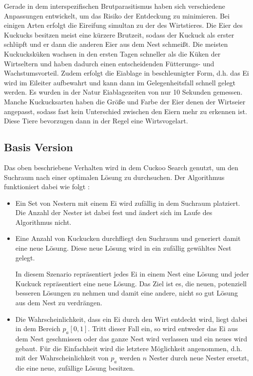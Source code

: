 \documentclass[conference]{IEEEtran}
\begin{document}
      Gerade in dem interspezifischen Brutparasitismus haben sich verschiedene Anpassungen entwickelt, um das Risiko der Entdeckung 
      zu minimieren. Bei einigen Arten erfolgt die Eireifung simultan zu der des Wirtstieres. Die Eier des Kuckucks besitzen meist 
      eine kürzere Brutzeit, sodass der Kuckuck als erster schlüpft und er dann die anderen Eier aus dem Nest schmeißt. Die meisten 
      Kuckucksküken wachsen in den ersten Tagen schneller als die Küken der Wirtseltern und haben dadurch einen entscheidenden 
      Fütterungs- und Wachstumsvorteil.  Zudem erfolgt die Eiablage in beschleunigter Form, d.h. das Ei wird im Eileiter aufbewahrt 
      und kann dann im Gelegenheitsfall schnell gelegt werden. Es wurden in der Natur Eiablagezeiten von nur 10 Sekunden gemessen. 
      Manche Kuckucksarten haben die Größe und Farbe der Eier denen der Wirtseier angepasst, sodass fast kein Unterschied zwischen 
      den Eiern mehr zu erkennen ist. Diese Tiere bevorzugen dann in der Regel eine Wirtsvogelart.         


    \subsection{Basis Version}
      Das oben beschriebene Verhalten wird in dem Cuckoo Search genutzt, um den Suchraum nach einer optimalen Lösung 
      zu durchsuchen. Der Algorithmus funktioniert dabei wie folgt \cite{b1}:

      \begin{itemize}
        \item Ein Set von Nestern mit einem Ei wird zufällig in dem Suchraum platziert. Die Anzahl der Nester 
          ist dabei fest und ändert sich im Laufe des Algorithmus nicht. 

        \item Eine Anzahl von Kuckucken durchfliegt den Suchraum und generiert damit eine neue Lösung. Diese 
          neue Lösung wird in ein zufällig gewähltes Nest gelegt. 

          In diesem Szenario repräsentiert jedes Ei in einem Nest eine Lösung und jeder Kuckuck repräsentiert eine 
          neue Lösung. Das Ziel ist es, die neuen, potenziell besseren Lösungen zu nehmen und damit eine andere, 
          nicht so gut Lösung aus dem Nest zu verdrängen. 

        \item Die Wahrscheinlichkeit, dass ein Ei durch den Wirt entdeckt wird, liegt dabei in dem Bereich $p_{a}[0,1]$. 
          Tritt dieser Fall ein, so wird entweder das Ei aus dem Nest geschmissen oder das ganze Nest wird verlassen 
          und ein neues wird gebaut. Für die Einfachheit wird die letztere Möglichkeit angenommen, d.h. mit 
          der Wahrscheinlichkeit von $p_{a}$ werden $n$ Nester durch neue Nester ersetzt, die eine neue, zufällige Lösung besitzen. 
      \end{itemize}
\end{document}
